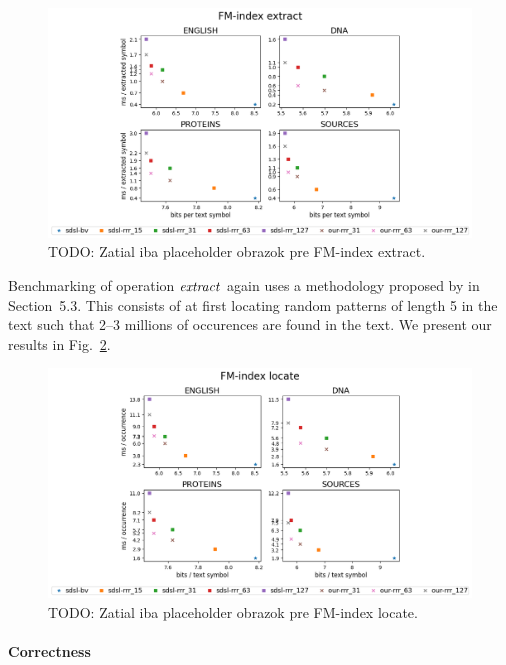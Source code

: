\begin{figure}
	\centerline{
		\includegraphics[width=\textwidth, height=0.35\textheight]{images/vysledky_sdsl_extract}
	}
	\caption[TODO]{TODO: Zatial iba placeholder obrazok pre FM-index extract.
	}
	\label{obr:benchmark_sdsl_extract}
\end{figure}

Benchmarking of operation $\mathit{extract}$ again uses a methodology proposed by \cite{ferragina2009compressed} 
in Section~5.3. This consists of at first locating random patterns of length 5 in the text such
that 2--3 millions of occurences are found in the text. We present our results in Fig.~\ref{obr:benchmark_sdsl_locate}.

\begin{figure}
	\centerline{
		\includegraphics[width=\textwidth, height=0.35\textheight]{images/vysledky_sdsl_locate}
	}
	\caption[TODO]{TODO: Zatial iba placeholder obrazok pre FM-index locate.
	}
	\label{obr:benchmark_sdsl_locate}
\end{figure}

\paragraph{Correctness}

